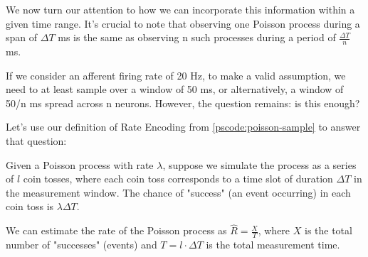 We now turn our attention to how we can incorporate this information within a given time range. It's crucial to note that observing one Poisson process during a span of $\Delta T$ ms is the same as observing n such processes during a period of $\frac{\Delta T}{n}$ ms.

If we consider an afferent firing rate of 20 Hz, to make a valid assumption, we need to at least sample over a window of 50 ms, or alternatively, a window of 50/n ms spread across n neurons. However, the question remains: is this enough?

Let's use our definition of Rate Encoding from \ref{pscode:poisson-sample} to answer that question:

Given a Poisson process with rate $\lambda$, suppose we simulate the process as a series of $l$ coin tosses, where each coin toss corresponds to a time slot of duration $\Delta T$ in the measurement window. The chance of "success" (an event occurring) in each coin toss is $\lambda \Delta T$.

We can estimate the rate of the Poisson process as $\hat{R} = \frac{X}{T}$, where $X$ is the total number of "successes" (events) and $T = l \cdot \Delta T$ is the total measurement time.

